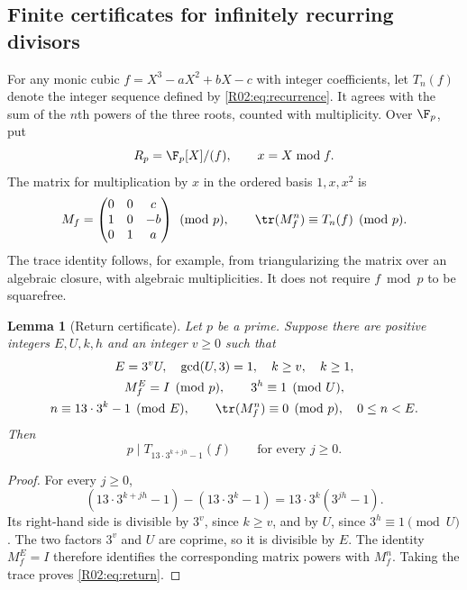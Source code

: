 \documentclass[11pt,a4paper]{article}
\newtheorem{lemma}[theorem]{Lemma}\newtheorem{proposition}[theorem]{Proposition}
\theoremstyle{definition}\newtheorem{definition}[theorem]{Definition}
\theoremstyle{remark}\newtheorem{remark}[theorem]{Remark}
\begin{document}
\subsection{Finite certificates for infinitely recurring divisors}
\label{R02:sec:certificates}

For any monic cubic $f=X^3-aX^2+bX-c$ with integer coefficients,
let $T_n(f)$ denote the integer sequence defined by
\eqref{R02:eq:recurrence}. It agrees with the sum of the $n$th powers of
the three roots, counted with multiplicity. Over $\F_p$, put
\[
 R_p=\F_p[X]/(f),\qquad x=X\bmod f.
\]
The matrix for multiplication by $x$ in the ordered basis
$1,x,x^2$ is
\begin{equation}\label{R02:eq:matrix}
 M_f=\begin{pmatrix}0&0&c\\1&0&-b\\0&1&a\end{pmatrix}\pmod p,
 \qquad \tr(M_f^n)\equiv T_n(f)\pmod p.
\end{equation}
The trace identity follows, for example, from triangularizing the
matrix over an algebraic closure, with algebraic multiplicities. It
does not require $f\bmod p$ to be squarefree.

\begin{lemma}[Return certificate]\label{R02:lem:return}
Let $p$ be a prime. Suppose there are positive integers $E,U,k,h$
and an integer $v\ge0$ such that
\begin{equation}\label{R02:eq:certconditions}
 \begin{gathered}
 E=3^vU,\quad \gcd(U,3)=1,\quad k\ge v,\quad k\ge1,\\
 M_f^E=I\pmod p,\qquad 3^h\equiv1\pmod U,\\
 n\equiv13\cdot3^k-1\pmod E,\qquad
 \tr(M_f^n)\equiv0\pmod p,
 \quad 0\le n<E.
 \end{gathered}
\end{equation}
Then
\begin{equation}\label{R02:eq:return}
 p\mid T_{13\cdot3^{k+jh}-1}(f)\qquad\text{for every }j\ge0.
\end{equation}
\end{lemma}
\begin{proof}
For every $j\ge0$,
\[
 (13\cdot3^{k+jh}-1)-(13\cdot3^k-1)
 =13\cdot3^k(3^{jh}-1).
\]
Its right-hand side is divisible by $3^v$, since $k\ge v$, and by
$U$, since $3^h\equiv1\pmod U$. The two factors $3^v$ and $U$ are
coprime, so it is divisible by $E$. The identity $M_f^E=I$ therefore
identifies the corresponding matrix powers with $M_f^n$. Taking the
trace proves \eqref{R02:eq:return}.
\end{proof}
\end{document}
